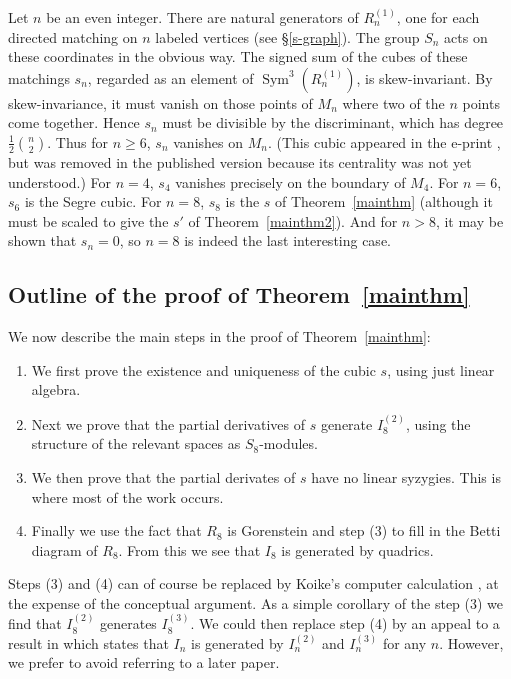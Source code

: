 \documentclass{amsart}
\theoremstyle{definition}
\theoremstyle{remark}
\newcommand{\sfrac}[2]{{\textstyle \frac{#1}{#2}}}
\DeclareMathOperator{\Sym}{Sym}
\def\half{\sfrac{1}{2}}
\begin{document}
Let $n$ be an even integer.
There are natural generators of $R^{(1)}_n$, one for each directed matching
on $n$ labeled vertices (see \S \ref{s-graph}).  The group $S_n$ acts on
these coordinates in the obvious way.  The signed sum of the cubes of these
matchings $s_n$, regarded as an element of $\Sym^3(R_n^{(1)})$, is
skew-invariant.  By skew-invariance, it must vanish on those points of
$M_n$ where two of the $n$ points come together.  Hence $s_n$ must be
divisible by the discriminant, which has degree $\half \binom{n}{2}$.  Thus for
$n \geq 6$, $s_n$ vanishes on $M_n$.  (This cubic appeared in the e-print
\cite[\S 2.10]{hmsveprint}, but was removed in the published version because
its centrality was not yet understood.)  For $n=4$, $s_4$ vanishes precisely
on the boundary of $M_4$.  For $n=6$, $s_6$ is the Segre cubic.  For $n=8$,
$s_8$ is the $s$ of Theorem~\ref{mainthm} (although it must be scaled to give
the $s'$ of Theorem~\ref{mainthm2}).  And for $n > 8$, it may be shown that
$s_n=0$, so $n=8$ is indeed the last interesting case.
\label{other}


\subsection{Outline of the proof of Theorem~\ref{mainthm}}

We now describe the main steps in the proof of Theorem~\ref{mainthm}:
\begin{enumerate}
\item We first prove the existence and uniqueness of the cubic $s$, using
just linear algebra.
\item Next we prove that the partial derivatives of $s$ generate $I_8^{(2)}$,
using the structure of
the relevant spaces as $S_8$-modules.
\item We then prove that the partial derivates of $s$ have no linear syzygies.
This is where most of the work occurs.
\item Finally we use the fact that $R_8$ is Gorenstein and step (3) to fill in the
Betti diagram of $R_8$.  From this we see that $I_8$ is generated by quadrics.
\end{enumerate}
Steps (3) and (4) can of course be replaced by Koike's computer calculation
\cite{koike}, at the expense of the conceptual argument.  As a simple corollary
of the step (3) we find that $I_8^{(2)}$ generates $I_8^{(3)}$.  We could then
replace step (4) by an appeal to a result in \cite{HMSV} which states that $I_n$
is generated by $I_n^{(2)}$ and $I_n^{(3)}$ for any $n$.  However, we prefer to
avoid referring to a later paper.
\end{document}
